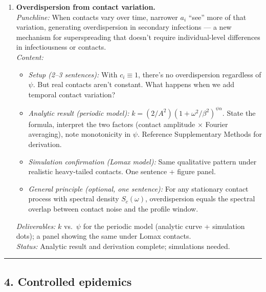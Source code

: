 \begin{description}
\begin{enumerate}
        \item \textbf{Overdispersion from contact variation.} \\
        \textit{Punchline:} When contacts vary over time, narrower $a_i$ ``see'' more of that variation, generating overdispersion in secondary infections --- a new mechanism for superspreading that doesn't require individual-level differences in infectiousness or contacts. \\
        \textit{Content:}
        \begin{itemize}
            \item \textit{Setup (2--3 sentences):} With $c_i \equiv 1$, there's no overdispersion regardless of $\psi$. But real contacts aren't constant. What happens when we add temporal contact variation?
            \item \textit{Analytic result (periodic model):} $k = (2/A^2)(1 + \omega^2/\beta^2)^{\psi\alpha}$. State the formula, interpret the two factors (contact amplitude $\times$ Fourier averaging), note monotonicity in $\psi$. Reference Supplementary Methods for derivation.
            \item \textit{Simulation confirmation (Lomax model):} Same qualitative pattern under realistic heavy-tailed contacts. One sentence + figure panel.
            \item \textit{General principle (optional, one sentence):} For any stationary contact process with spectral density $S_c(\omega)$, overdispersion equals the spectral overlap between contact noise and the profile window.
        \end{itemize}
        \textit{Deliverables:} $k$ vs.\ $\psi$ for the periodic model (analytic curve + simulation dots); a panel showing the same under Lomax contacts. \\
        \textit{Status:} Analytic result and derivation complete; simulations needed.
    \end{enumerate}
\end{description}

\noindent\rule{\textwidth}{0.4pt}

\subsection*{4. Controlled epidemics}

